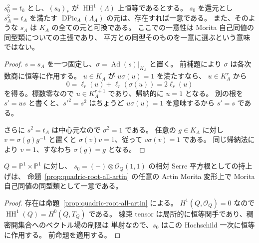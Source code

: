 \begin{proposition}
\label{prop:artin-serre-root-uniqueness}
$s_0^2=t_k$ とし、$(s_0)_*$ が
$\operatorname{HH}^1(\Lambda)$ 上恒等であるとする。
$s_0$ を還元とし $s_A^2=t_A$ を満たす
$\operatorname{DPic}_A(\Lambda_A)$ の元は、存在すれば一意である。
また、そのような $s_A$ は $K_A$ の全ての元と可換である。
ここでの一意性は Morita 自己同値の同型類についての主張であり、
平方との同型そのものを一意に選ぶという意味ではない。
\end{proposition}
\begin{proof}
$s=s_A$ を一つ固定し、$\sigma=\operatorname{Ad}(s)|_{K_A}$ と置く。
前補題により $\sigma$ は各次数商に恒等に作用する。
$u\in K_A$ が $u\sigma(u)=1$ を満たすなら、
$u\in K_A^r$ から
\[
 0=\ell_r(u)+\ell_r(\sigma(u))=2\ell_r(u)
\]
を得る。標数零なので $u\in K_A^{r+1}$ であり、帰納的に $u=1$ となる。
別の根を $s'=us$ と書くと、$s'^2=s^2$ はちょうど
$u\sigma(u)=1$ を意味するから $s'=s$ である。

さらに $s^2=t_A$ は中心元なので $\sigma^2=1$ である。
任意の $g\in K_A$ に対し $v=\sigma(g)g^{-1}$ と置くと
$\sigma(v)v=1$、従って $v\sigma(v)=1$ である。
同じ帰納法により $v=1$、すなわち $\sigma(g)=g$ となる。
\end{proof}

\begin{corollary}
\label{cor:quadric-root-unique-all-artin}
$Q=\mathbb P^1\times\mathbb P^1$ に対し、
$s_0=(-)\otimes\mathcal O_Q(1,1)$ の相対 Serre 平方根としての持上げは、
命題~\ref{prop:quadric-root-all-artin} の任意の Artin Morita 変形上で
Morita 自己同値の同型類として一意である。
\end{corollary}
\begin{proof}
存在は命題~\ref{prop:quadric-root-all-artin} による。
$H^1(Q,\mathcal O_Q)=0$ なので
$\operatorname{HH}^1(Q)=H^0(Q,T_Q)$ である。
線束 tensor は局所的に恒等関手であり、稠密開集合へのベクトル場の制限は
単射なので、$s_0$ はこの Hochschild 一次に恒等に作用する。
前命題を適用する。
\end{proof}

